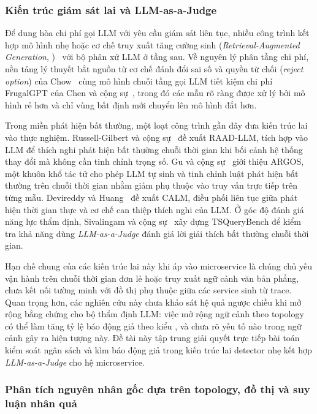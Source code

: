 \subsubsection{Kiến trúc giám sát lai và LLM-as-a-Judge}
\label{sec:ch3-hybrid-judge}

Để dung hòa chi phí gọi LLM với yêu cầu giám sát liên tục, nhiều công trình kết hợp mô hình nhẹ hoặc cơ chế truy xuất tăng cường sinh (\emph{Retrieval-Augmented Generation}, )~\cite{lewis2020rag} với bộ phân xử LLM ở tầng sau. Về nguyên lý phân tầng chi phí, nền tảng lý thuyết bắt nguồn từ cơ chế đánh đổi sai số và quyền từ chối (\emph{reject option}) của Chow~\cite{chow1970reject} cùng mô hình chuỗi tầng gọi LLM tiết kiệm chi phí FrugalGPT của Chen và cộng sự~\cite{chen2024frugalgpt}, trong đó các mẫu rõ ràng được xử lý bởi mô hình rẻ hơn và chỉ vùng bất định mới chuyển lên mô hình đắt hơn.

Trong miền phát hiện bất thường, một loạt công trình gần đây đưa kiến trúc lai vào thực nghiệm. Russell-Gilbert và cộng sự~\cite{raad-llm} đề xuất RAAD-LLM, tích hợp  vào LLM để thích nghi phát hiện bất thường chuỗi thời gian khi bối cảnh hệ thống thay đổi mà không cần tinh chỉnh trọng số. Gu và cộng sự~\cite{argos} giới thiệu ARGOS, một khuôn khổ tác tử cho phép LLM tự sinh và tinh chỉnh luật phát hiện bất thường trên chuỗi thời gian nhằm giảm phụ thuộc vào truy vấn trực tiếp trên từng mẫu. Devireddy và Huang~\cite{calm} đề xuất CALM, điều phối liên tục giữa phát hiện thời gian thực và cơ chế can thiệp thích nghi của LLM. Ở góc độ đánh giá năng lực thẩm định, Sivalingam và cộng sự~\cite{judge} xây dựng TSQueryBench để kiểm tra khả năng dùng \emph{LLM-as-a-Judge} đánh giá lời giải thích bất thường chuỗi thời gian.

Hạn chế chung của các kiến trúc lai này khi áp vào microservice là chúng chủ yếu vận hành trên chuỗi thời gian đơn lẻ hoặc truy xuất ngữ cảnh văn bản phẳng, chưa kết nối tường minh với đồ thị phụ thuộc giữa các service sinh từ trace. Quan trọng hơn, các nghiên cứu này chưa khảo sát hệ quả ngược chiều khi mở rộng bằng chứng cho bộ thẩm định LLM: việc mở rộng ngữ cảnh theo topology có thể làm tăng tỷ lệ báo động giả theo kiểu , và chưa rõ yếu tố nào trong ngữ cảnh gây ra hiện tượng này. Đề tài này tập trung giải quyết trực tiếp bài toán kiểm soát ngân sách và kìm báo động giả trong kiến trúc lai detector nhẹ kết hợp \emph{LLM-as-a-Judge} cho hệ microservice.

\subsubsection{Phân tích nguyên nhân gốc dựa trên topology, đồ thị và suy luận nhân quả}
\label{sec:ch3-rca-graph}


